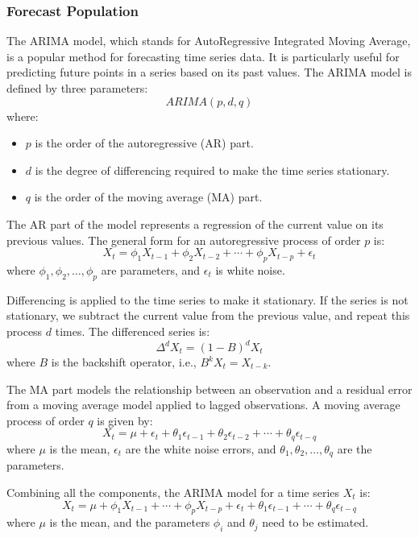 \documentclass[withoutpreface,bwprint]{cumcmthesis} %
\begin{document}
\subsubsection{Forecast Population}
\begin{definition}
The ARIMA model, which stands for AutoRegressive Integrated Moving Average, is a popular method for forecasting time series data. It is particularly useful for predicting future points in a series based on its past values. The ARIMA model is defined by three parameters:
\[
ARIMA(p, d, q)
\]
where:
\begin{itemize}
    \item \( p \) is the order of the autoregressive (AR) part.
    \item \( d \) is the degree of differencing required to make the time series stationary.
    \item \( q \) is the order of the moving average (MA) part.
\end{itemize}

The AR part of the model represents a regression of the current value on its previous values. The general form for an autoregressive process of order \( p \) is:
\[
X_t = \phi_1 X_{t-1} + \phi_2 X_{t-2} + \cdots + \phi_p X_{t-p} + \epsilon_t
\]
where \( \phi_1, \phi_2, \dots, \phi_p \) are parameters, and \( \epsilon_t \) is white noise.

Differencing is applied to the time series to make it stationary. If the series is not stationary, we subtract the current value from the previous value, and repeat this process \( d \) times. The differenced series is:
\[
\Delta^d X_t = (1 - B)^d X_t
\]
where \( B \) is the backshift operator, i.e., \( B^k X_t = X_{t-k} \).

The MA part models the relationship between an observation and a residual error from a moving average model applied to lagged observations. A moving average process of order \( q \) is given by:
\[
X_t = \mu + \epsilon_t + \theta_1 \epsilon_{t-1} + \theta_2 \epsilon_{t-2} + \cdots + \theta_q \epsilon_{t-q}
\]
where \( \mu \) is the mean, \( \epsilon_t \) are the white noise errors, and \( \theta_1, \theta_2, \dots, \theta_q \) are the parameters.

Combining all the components, the ARIMA model for a time series \( X_t \) is:
\[
X_t = \mu + \phi_1 X_{t-1} + \cdots + \phi_p X_{t-p} + \epsilon_t + \theta_1 \epsilon_{t-1} + \cdots + \theta_q \epsilon_{t-q}
\]
where \( \mu \) is the mean, and the parameters \( \phi_i \) and \( \theta_j \) need to be estimated.
\end{definition}
\end{document}
